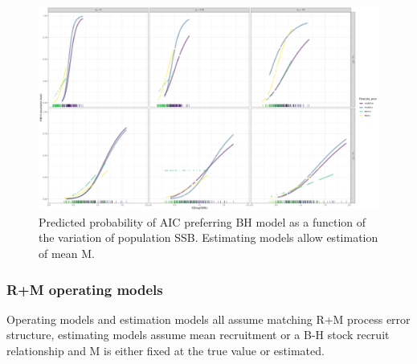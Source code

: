 \documentclass[
  12pt,
]{article}
\begin{document}
\begin{figure}
\caption{Predicted probability of AIC preferring BH model as a function of the variation of population SSB. Estimating models allow estimation of mean M.}\label{naa_om_ME_BH_glm_AIC_plots}
\begin{center}
\includegraphics[width = \textwidth]{naa_om_ME_pred_BH_best.png}
\end{center}
\end{figure}

\hypertarget{rm-operating-models-2}{%
\subsubsection*{R+M operating models}\label{rm-operating-models-2}}

\begin{table}
\caption{Operating models and estimation models all assume matching R+M process error structure, estimating models assume mean recruitment or a B-H stock recruit relationship and M is either fixed at the true value or estimated.}
{}
\end{table}
\end{document}
